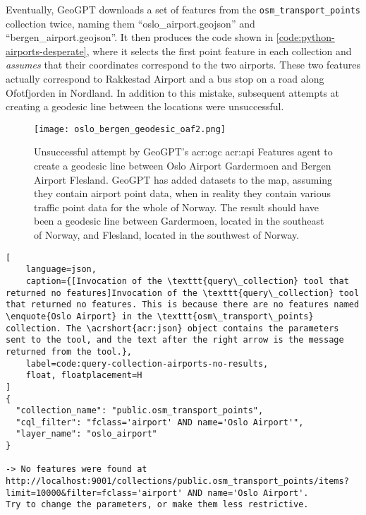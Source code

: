 Eventually, GeoGPT downloads a set of features from the \texttt{osm\_transport\_points} collection twice, naming them \enquote{oslo\_airport.geojson} and \enquote{bergen\_airport.geojson}. It then produces the code shown in \autoref{code:python-airports-desperate}, where it selects the first point feature in each collection and \textit{assumes} that their coordinates correspond to the two airports. These two features actually correspond to Rakkestad Airport and a bus stop on a road along Ofotfjorden in Nordland. In addition to this mistake, subsequent attempts at creating a geodesic line between the locations were unsuccessful.

\begin{figure}[htbp]
    \centering
    \texttt{[image: oslo\_bergen\_geodesic\_oaf2.png]}
    \caption[Unsuccessful attempt by GeoGPT's OGC API Features agent to create a geodesic line between Oslo Airport Gardermoen and Bergen Airport Flesland]{Unsuccessful attempt by GeoGPT's \acrshort{acr:ogc} \acrshort{acr:api} Features agent to create a geodesic line between Oslo Airport Gardermoen and Bergen Airport Flesland. GeoGPT has added datasets to the map, assuming they contain airport point data, when in reality they contain various traffic point data for the whole of Norway. The result should have been a geodesic line between Gardermoen, located in the southeast of Norway, and Flesland, located in the southwest of Norway.}
    \label{fig:oaf-geodesic-unsuccessful}
\end{figure}


\begin{lstlisting}[
    language=json,
    caption={[Invocation of the \texttt{query\_collection} tool that returned no features]Invocation of the \texttt{query\_collection} tool that returned no features. This is because there are no features named \enquote{Oslo Airport} in the \texttt{osm\_transport\_points} collection. The \acrshort{acr:json} object contains the parameters sent to the tool, and the text after the right arrow is the message returned from the tool.},
    label=code:query-collection-airports-no-results,
    float, floatplacement=H
]
{
  "collection_name": "public.osm_transport_points",
  "cql_filter": "fclass='airport' AND name='Oslo Airport'",
  "layer_name": "oslo_airport"
}

-> No features were found at http://localhost:9001/collections/public.osm_transport_points/items?limit=10000&filter=fclass='airport' AND name='Oslo Airport'.
Try to change the parameters, or make them less restrictive.
\end{lstlisting}

